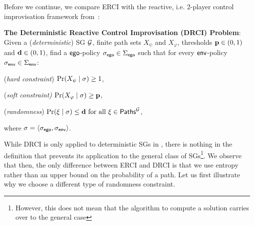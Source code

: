 Before we continue, we compare ERCI with the reactive, i.e. 2-player control improvisation framework from~\cite{}:
\begin{mdframed}
\textbf{The Deterministic Reactive Control Improvisation (DRCI) Problem}:
Given a (\emph{deterministic}) SG $\mathcal{G}$, finite path sets $X_\psi$ and $X_\varphi$,  thresholds $\mathbf{p} \in (0,1)$ and $\mathbf{d} \in (0,1)$,  find a $\mathsf{ego}$-policy ${\sigma_{\mathsf{ego}}} \in \Sigma_{\mathsf{ego}}$  such that for every $\mathsf{env}$-policy ${\sigma_{\mathsf{env}}} \in \Sigma_{\mathsf{env}}$: 
\begin{compactenum}
\item (\emph{hard constraint}) $\Pr(X_\psi \mid \sigma) \geq 1$,
	\item (\emph{soft constraint)} $\Pr(X_\varphi \mid \sigma) \geq \mathbf{p}$,
	\item (\emph{randomness}) $\Pr(\xi \mid \sigma) \leq \mathbf{d} \text{ for all } \xi \in \mathsf{Paths}^{\mathcal{G}}_{}$,
\end{compactenum}
where  $\sigma = \langle {\sigma_{\mathsf{ego}}}, {\sigma_{\mathsf{env}}} \rangle$.
\end{mdframed}
While DRCI is only applied to deterministic SGs in \cite{DBLP:conf/cav/FremontS18}, there is nothing in the definition that prevents its application to the general class of SGs\footnote{However, this does not mean that the algorithm to compute a solution carries over to the general case}.
We observe that then, the only difference between ERCI and DRCI is that we use entropy rather than an upper bound on the probability of a path.  Let us first illustrate why we choose a different type of randomness constraint.
